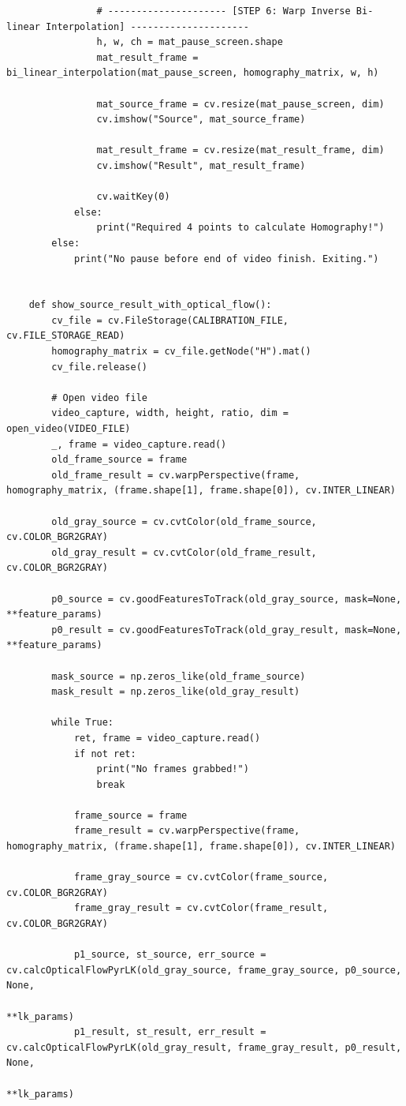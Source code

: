 \documentclass[a4paper,12pt]{article}
\begin{document}
\begin{lstlisting}
				# --------------------- [STEP 6: Warp Inverse Bi-linear Interpolation] ---------------------
				h, w, ch = mat_pause_screen.shape
				mat_result_frame = bi_linear_interpolation(mat_pause_screen, homography_matrix, w, h)
	
				mat_source_frame = cv.resize(mat_pause_screen, dim)
				cv.imshow("Source", mat_source_frame)
	
				mat_result_frame = cv.resize(mat_result_frame, dim)
				cv.imshow("Result", mat_result_frame)
	
				cv.waitKey(0)
			else:
				print("Required 4 points to calculate Homography!")
		else:
			print("No pause before end of video finish. Exiting.")
	
	
	def show_source_result_with_optical_flow():
		cv_file = cv.FileStorage(CALIBRATION_FILE, cv.FILE_STORAGE_READ)
		homography_matrix = cv_file.getNode("H").mat()
		cv_file.release()
	
		# Open video file
		video_capture, width, height, ratio, dim = open_video(VIDEO_FILE)
		_, frame = video_capture.read()
		old_frame_source = frame
		old_frame_result = cv.warpPerspective(frame, homography_matrix, (frame.shape[1], frame.shape[0]), cv.INTER_LINEAR)
	
		old_gray_source = cv.cvtColor(old_frame_source, cv.COLOR_BGR2GRAY)
		old_gray_result = cv.cvtColor(old_frame_result, cv.COLOR_BGR2GRAY)
	
		p0_source = cv.goodFeaturesToTrack(old_gray_source, mask=None, **feature_params)
		p0_result = cv.goodFeaturesToTrack(old_gray_result, mask=None, **feature_params)
	
		mask_source = np.zeros_like(old_frame_source)
		mask_result = np.zeros_like(old_gray_result)
	
		while True:
			ret, frame = video_capture.read()
			if not ret:
				print("No frames grabbed!")
				break
	
			frame_source = frame
			frame_result = cv.warpPerspective(frame, homography_matrix, (frame.shape[1], frame.shape[0]), cv.INTER_LINEAR)
	
			frame_gray_source = cv.cvtColor(frame_source, cv.COLOR_BGR2GRAY)
			frame_gray_result = cv.cvtColor(frame_result, cv.COLOR_BGR2GRAY)
	
			p1_source, st_source, err_source = cv.calcOpticalFlowPyrLK(old_gray_source, frame_gray_source, p0_source, None,
																	   **lk_params)
			p1_result, st_result, err_result = cv.calcOpticalFlowPyrLK(old_gray_result, frame_gray_result, p0_result, None,
																	   **lk_params)
	

\end{lstlisting}
\end{document}

